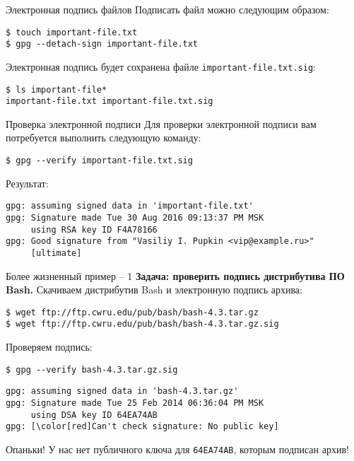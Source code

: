 \documentclass[presentation]{beamer}
\begin{document}
\begin{frame}[fragile]{Электронная подпись файлов}
  Подписать файл можно следующим образом:
\begin{verbatim}
$ touch important-file.txt
$ gpg --detach-sign important-file.txt
\end{verbatim}

  Электронная подпись будет сохранена файле
  \texttt{important-file.txt.sig}:
\begin{verbatim}
$ ls important-file*
important-file.txt important-file.txt.sig
\end{verbatim}
\end{frame}

\begin{frame}[fragile]{Проверка электронной подписи}
  Для проверки электронной подписи вам потребуется выполнить следующую
  команду:
\begin{verbatim}
$ gpg --verify important-file.txt.sig
\end{verbatim}

  Результат:
  \footnotesize
\begin{verbatim}
gpg: assuming signed data in 'important-file.txt'
gpg: Signature made Tue 30 Aug 2016 09:13:37 PM MSK
     using RSA key ID F4A78166
gpg: Good signature from "Vasiliy I. Pupkin <vip@example.ru>"
     [ultimate]
\end{verbatim}
  \normalsize
\end{frame}

\begin{frame}[fragile]{Более жизненный пример -- 1}
  \textbf{Задача: проверить подпись дистрибутива ПО Bash.}
  Скачиваем дистрибутив Bash и электронную подпись архива:
\begin{verbatim}
$ wget ftp://ftp.cwru.edu/pub/bash/bash-4.3.tar.gz
$ wget ftp://ftp.cwru.edu/pub/bash/bash-4.3.tar.gz.sig
\end{verbatim}
  Проверяем подпись:
\begin{verbatim}
$ gpg --verify bash-4.3.tar.gz.sig
\end{verbatim}
  \footnotesize
\begin{Verbatim}[commandchars=\\\[\]]
gpg: assuming signed data in 'bash-4.3.tar.gz'
gpg: Signature made Tue 25 Feb 2014 06:36:04 PM MSK
     using DSA key ID 64EA74AB
gpg: [\color[red]Can't check signature: No public key]
\end{Verbatim}
  \normalsize

  \vspace{5 mm}

  Опаньки!  У нас нет публичного ключа для \texttt{64EA74AB}, которым
  подписан архив!
\end{frame}
\end{document}

